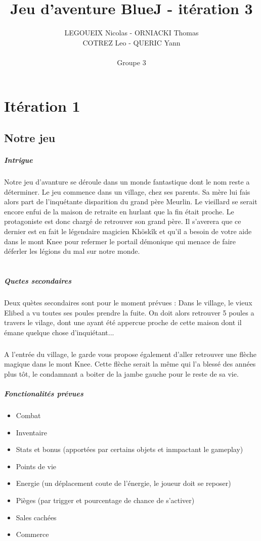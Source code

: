 \documentclass[11pt,a4paper]{report}
\author{LEGOUEIX Nicolas - ORNIACKI Thomas\\ COTREZ Leo - QUERIC Yann\\~\\ Groupe 3}
\title{Jeu d'aventure BlueJ - itération 3}
\begin{document}
\maketitle
\chapter{Itération 1}
\section{Notre jeu}
\paragraph{Intrigue}
Notre jeu d'avanture se déroule dans un monde fantastique dont le nom reste a déterminer. Le jeu commence dans un village, chez ses parents. Sa mère lui fais alors part de l'inquétante disparition du grand père Meurlin. Le vieillard se serait encore enfui de la maison de retraite en hurlant que la fin était proche. Le protagoniste est donc chargé de retrouver son grand père. Il s'averera que ce dernier est en fait le légendaire magicien Khöskîk et qu'il a besoin de votre aide dans le mont Knee pour refermer le portail démonique qui menace de faire déferler les légions du mal sur notre monde.\\~\\
\paragraph{Quetes secondaires}
Deux quètes secondaires sont pour le moment prévues : Dans le village, le vieux Elibed a vu toutes ses poules prendre la fuite. On doit alors retrouver 5 poules a travers le vilage, dont une ayant été appercue proche de cette maison dont il émane quelque chose d'inquiétant...
\paragraph{}
A l'entrée du village, le garde vous propose également d'aller retrouver une flèche magique dans le mont Knee. Cette flèche serait la même qui l'a blessé des années plus tôt, le condamnant a boiter de la jambe gauche pour le reste de sa vie.
\paragraph{Fonctionalités prévues}
\begin{itemize}
\item Combat
\item Inventaire
\item Stats et bonus (apportées par certains objets et inmpactant le gameplay)
\item Points de vie
\item Energie (un déplacement coute de l'énergie, le joueur doit se reposer)
\item Pièges (par trigger et pourcentage de chance de s'activer)
\item Sales cachées
\item Commerce
\end{itemize}
\end{document}
